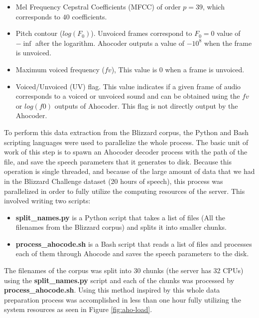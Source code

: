 \begin{itemize}
    \item{Mel Frequency Cepstral Coefficients (MFCC) of order $p = 39$, which corresponds to $40$ coefficients.}
    \item{Pitch contour ($log(F_0)$). Unvoiced frames correspond to $F_0 = 0$ value of $-\inf$ after the logarithm. Ahocoder outputs a value of $-10^8$ when the frame is unvoiced.}
    \item{Maximum voiced frequency ($fv$), This value is 0 when a frame is unvoiced.}
    \item{Voiced/Unvoiced (UV) flag. This value indicates if a given frame of audio corresponds to a voiced or unvoiced sound and can be obtained using the $fv$ or $log(f0)$ outputs of Ahocoder. This flag is not directly output by the Ahocoder.}
\end{itemize}

To perform this data extraction from the Blizzard corpus, the Python and Bash scripting languages were used to parallelize the whole process. The basic unit of work of this step is to spawn an Ahocoder decoder process with the path of the file, and save the speech parameters that it generates to disk. Because this operation is single threaded, and because of the large amount of data that we had in the Blizzard Challenge dataset (20 hours of speech), this process was parallelized in order to fully utilize the computing resources of the server. This involved writing two scripts:

\begin{itemize}
    \item \textbf{split\_names.py} is a Python script that takes a list of files (All the filenames from the Blizzard corpus) and splits it into smaller chunks.
    \item \textbf{process\_ahocode.sh} is a Bash script that reads a list of files and processes each of them through Ahocode and saves the speech parameters to the disk.
\end{itemize}

The filenames of the corpus was split into 30 chunks (the server has 32 CPUs) using the \textbf{split\_names.py} script and each of the chunks was processed by \textbf{process\_ahocode.sh}. Using this method inspired by \cite{pascual2016deep} this whole data preparation process was accomplished in less than one hour fully utilizing the system resources as seen in Figure \ref{fig:aho-load}.

